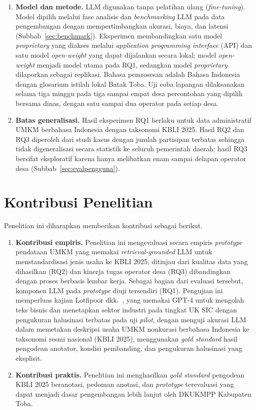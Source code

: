 \begin{enumerate}[label=\arabic*., leftmargin=*]
  \item \textbf{Model dan metode.} LLM digunakan tanpa pelatihan ulang (\textit{fine-tuning}). Model dipilih melalui fase analisis dan \textit{benchmarking} LLM pada data pengembangan dengan mempertimbangkan akurasi, biaya, dan latensi (Subbab~\ref{sec:benchmark}). Eksperimen membandingkan satu model \textit{proprietary} yang diakses melalui \textit{application programming interface} (API) dan satu model \textit{open-weight} yang dapat dijalankan secara lokal; model \textit{open-weight} menjadi model utama pada RQ1, sedangkan model \textit{proprietary} dilaporkan sebagai replikasi. Bahasa pemrosesan adalah Bahasa Indonesia dengan glosarium istilah lokal Batak Toba. Uji coba lapangan dilaksanakan selama tiga minggu pada tiga sampai empat desa percontohan yang dipilih bersama dinas, dengan satu sampai dua operator pada setiap desa.
  \item \textbf{Batas generalisasi.} Hasil eksperimen RQ1 berlaku untuk data administratif UMKM berbahasa Indonesia dengan taksonomi KBLI 2025. Hasil RQ2 dan RQ3 diperoleh dari studi kasus dengan jumlah partisipan terbatas sehingga tidak digeneralisasi secara statistik ke seluruh pemerintah daerah; hasil RQ3 bersifat eksploratif karena hanya melibatkan enam sampai delapan operator desa (Subbab~\ref{sec:evalpengguna}).
\end{enumerate}

\section{Kontribusi Penelitian}
\label{sec:kontribusi}

Penelitian ini diharapkan memberikan kontribusi sebagai berikut.

\begin{enumerate}[label=\arabic*., leftmargin=*]
  \item \textbf{Kontribusi empiris.} Penelitian ini mengevaluasi secara empiris \textit{prototype} pendataan UMKM yang memakai \textit{retrieval-grounded} LLM untuk menstandardisasi jenis usaha ke KBLI 2025, ditinjau dari kualitas data yang dihasilkan (RQ2) dan kinerja tugas operator desa (RQ3) dibandingkan dengan proses berbasis lembar kerja. Sebagai bagian dari evaluasi tersebut, komponen LLM pada \textit{prototype} diuji tersendiri (RQ1). Pengujian ini memperluas kajian Lotfipoor dkk.\ \cite{lotfipoor2026llm}, yang memakai GPT-4 untuk mengolah teks bisnis dan menetapkan sektor industri pada tingkat UK SIC dengan pengukuran halusinasi terbatas pada uji \textit{pilot}, dengan menguji akurasi LLM dalam memetakan deskripsi usaha UMKM nonkurasi berbahasa Indonesia ke taksonomi resmi nasional (KBLI 2025), menggunakan \textit{gold standard} hasil pengodean anotator, kondisi pembanding, dan pengukuran halusinasi yang eksplisit.
  \item \textbf{Kontribusi praktis.} Penelitian ini menghasilkan \textit{gold standard} pengodean KBLI 2025 beranotasi, pedoman anotasi, dan \textit{prototype} terevaluasi yang dapat menjadi dasar pengembangan lebih lanjut oleh DKUKMPP Kabupaten Toba.
\end{enumerate}

